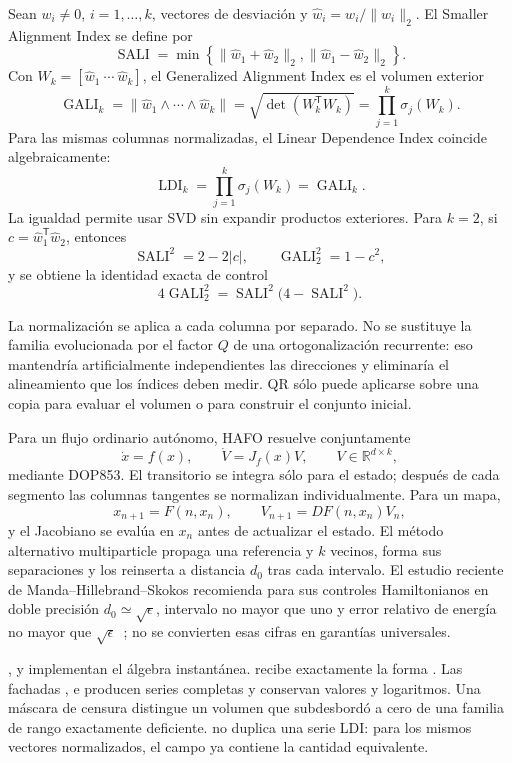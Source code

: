 Sean $w_i\ne0$, $i=1,\ldots,k$, vectores de desviación y
$\widehat w_i=w_i/\lVert w_i\rVert_2$. El Smaller Alignment Index se define
por~\cite{Skokos2001AlignmentIndices,SkokosEtAl2004SALI}
\[
 \operatorname{SALI}=
 \min\!\left\{
  \lVert\widehat w_1+\widehat w_2\rVert_2,
  \lVert\widehat w_1-\widehat w_2\rVert_2
 \right\}.
\]
Con $W_k=[\widehat w_1\ \cdots\ \widehat w_k]$, el Generalized Alignment
Index es el volumen exterior~\cite{SkokosBountisAntonopoulos2007GALI}
\[
 \operatorname{GALI}_k
 =\lVert\widehat w_1\wedge\cdots\wedge\widehat w_k\rVert
 =\sqrt{\det(W_k^{\mathsf T}W_k)}
 =\prod_{j=1}^{k}\sigma_j(W_k).
\]
Para las mismas columnas normalizadas, el Linear Dependence Index coincide
algebraicamente:
\[
 \operatorname{LDI}_k=\prod_{j=1}^{k}\sigma_j(W_k)
 =\operatorname{GALI}_k.
\]
La igualdad permite usar SVD sin expandir productos exteriores. Para
$k=2$, si $c=\widehat w_1^{\mathsf T}\widehat w_2$, entonces
\[
 \operatorname{SALI}^2=2-2|c|,
 \qquad \operatorname{GALI}_2^2=1-c^2,
\]
y se obtiene la identidad exacta de control
\[
 4\operatorname{GALI}_2^2
 =\operatorname{SALI}^2\bigl(4-\operatorname{SALI}^2\bigr).
\]

La normalización se aplica a cada columna por separado. No se sustituye la
familia evolucionada por el factor $Q$ de una ortogonalización recurrente:
eso mantendría artificialmente independientes las direcciones y eliminaría el
alineamiento que los índices deben medir. QR sólo puede aplicarse sobre una
copia para evaluar el volumen o para construir el conjunto inicial.

Para un flujo ordinario autónomo, HAFO resuelve conjuntamente
\[
 \dot x=f(x),\qquad \dot V=J_f(x)V,
 \qquad V\in\mathbb R^{d\times k},
\]
mediante DOP853. El transitorio se integra sólo para el estado; después de cada
segmento las columnas tangentes se normalizan individualmente. Para un mapa,
\[
 x_{n+1}=F(n,x_n),\qquad V_{n+1}=D F(n,x_n)V_n,
\]
y el Jacobiano se evalúa en $x_n$ antes de actualizar el estado. El método
alternativo multiparticle propaga una referencia y $k$ vecinos, forma sus
separaciones y los reinserta a distancia $d_0$ tras cada intervalo. El estudio
reciente de Manda--Hillebrand--Skokos recomienda para sus controles
Hamiltonianos en doble precisión $d_0\simeq\sqrt{\epsilon}$, intervalo no
mayor que uno y error relativo de energía no mayor que
$\sqrt{\epsilon}$~\cite{MandaHillebrandSkokos2025GALI}; no se convierten esas
cifras en garantías universales.

,
 y
 implementan el álgebra instantánea.
 recibe exactamente la forma
. Las fachadas
,
 e
 producen series completas y
conservan valores y logaritmos. Una máscara de censura distingue un volumen que
subdesbordó a cero de una familia de rango exactamente deficiente.
 no duplica una serie LDI: para los mismos
vectores normalizados, el campo  ya contiene la cantidad
equivalente.


